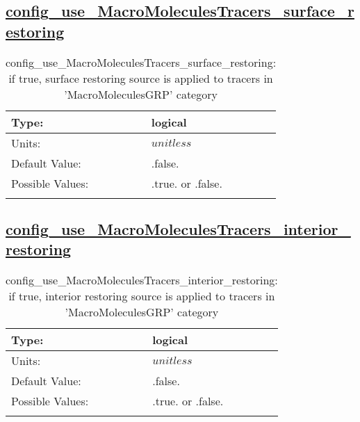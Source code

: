 \subsection[config\_use\_MacroMoleculesTracers\_surface\_restoring]{\hyperref[sec:nm_tab_tracer_forcing_MacroMoleculesTracers]{config\_use\_MacroMoleculesTracers\_surface\_restoring}}
\label{subsec:nm_sec_config_use_MacroMoleculesTracers_surface_restoring}
\begin{center}
\begin{longtable}{| p{2.0in} || p{4.0in} |}
    \hline
    Type: & logical \\
    \hline
    Units: & $unitless$ \\
    \hline
    Default Value: & .false. \\
    \hline
    Possible Values: & .true. or .false. \\
    \hline
    \caption{config\_use\_MacroMoleculesTracers\_surface\_restoring: if true, surface restoring source is applied to tracers in 'MacroMoleculesGRP' category}
\end{longtable}
\end{center}
\subsection[config\_use\_MacroMoleculesTracers\_interior\_restoring]{\hyperref[sec:nm_tab_tracer_forcing_MacroMoleculesTracers]{config\_use\_MacroMoleculesTracers\_interior\_restoring}}
\label{subsec:nm_sec_config_use_MacroMoleculesTracers_interior_restoring}
\begin{center}
\begin{longtable}{| p{2.0in} || p{4.0in} |}
    \hline
    Type: & logical \\
    \hline
    Units: & $unitless$ \\
    \hline
    Default Value: & .false. \\
    \hline
    Possible Values: & .true. or .false. \\
    \hline
    \caption{config\_use\_MacroMoleculesTracers\_interior\_restoring: if true, interior restoring source is applied to tracers in 'MacroMoleculesGRP' category}
\end{longtable}
\end{center}
